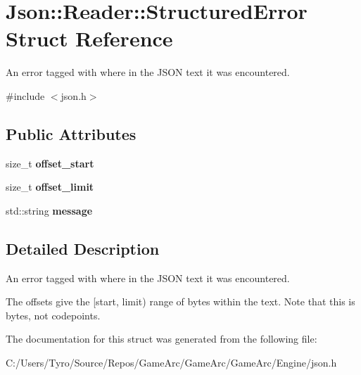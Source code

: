 \hypertarget{struct_json_1_1_reader_1_1_structured_error}{}\section{Json\+::Reader\+::Structured\+Error Struct Reference}
\label{struct_json_1_1_reader_1_1_structured_error}


An error tagged with where in the J\+S\+ON text it was encountered.  




{\ttfamily \#include $<$json.\+h$>$}

\subsection*{Public Attributes}
\begin{DoxyCompactItemize}
\item 
\mbox{\label{struct_json_1_1_reader_1_1_structured_error_a160dae4eb3464a2209b743c755baf65f}} 
size\+\_\+t {\bfseries offset\+\_\+start}
\item 
\mbox{\label{struct_json_1_1_reader_1_1_structured_error_a80747dae744bcc80a9bc81c94fd42e13}} 
size\+\_\+t {\bfseries offset\+\_\+limit}
\item 
\mbox{\label{struct_json_1_1_reader_1_1_structured_error_ab8755e5201b78c6ae077338f8819e6e6}} 
std\+::string {\bfseries message}
\end{DoxyCompactItemize}


\subsection{Detailed Description}
An error tagged with where in the J\+S\+ON text it was encountered. 

The offsets give the \mbox{[}start, limit) range of bytes within the text. Note that this is bytes, not codepoints. 

The documentation for this struct was generated from the following file\+:\begin{DoxyCompactItemize}
\item 
C\+:/\+Users/\+Tyro/\+Source/\+Repos/\+Game\+Arc/\+Game\+Arc/\+Game\+Arc/\+Engine/json.\+h\end{DoxyCompactItemize}
